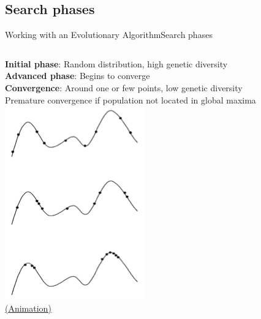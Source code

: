 \documentclass[10pt,compress]{beamer} %
\begin{document}
\subsection{Search phases}
\begin{frame}{Working with an Evolutionary Algorithm}{Search phases}
    \begin{columns}
	   \textbf{Initial phase}: Random distribution, high genetic diversity\\
	   \textbf{Advanced phase}: Begins to converge\\
	   \textbf{Convergence}: Around one or few points, low genetic diversity\\
	   \bigskip
	   Premature convergence if population not located in global maxima
		\includegraphics[width=\linewidth]{figs/fases.png}\\
		\centering\href{https://upload.wikimedia.org/wikipedia/commons/f/fe/Visualization\_of\_a\_population\_evolving\_in\_a\_static\_fitness\_landscape.gif}{(Animation)}
	\end{columns}
\end{frame}
\end{document}
